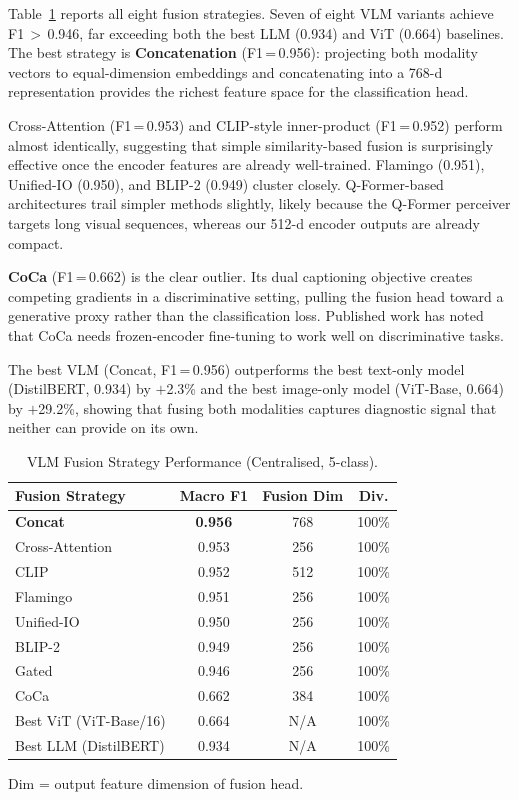 \documentclass[conference]{IEEEtran}
\begin{document}
Table~\ref{tab:vlmres} reports all eight fusion strategies.
Seven of eight VLM variants achieve F1\,$>$\,0.946, far exceeding
both the best LLM (0.934) and ViT (0.664) baselines. The best
strategy is \textbf{Concatenation} (F1\,=\,0.956): projecting both
modality vectors to equal-dimension embeddings and concatenating into a
768-d representation provides the richest feature space for the
classification head.

Cross-Attention (F1\,=\,0.953) and CLIP-style inner-product (F1\,=\,0.952)
perform almost identically, suggesting that simple similarity-based
fusion is surprisingly effective once the encoder features are already
well-trained. Flamingo (0.951), Unified-IO (0.950), and BLIP-2 (0.949)
cluster closely. Q-Former-based architectures trail simpler methods
slightly, likely because the Q-Former perceiver targets long visual
sequences, whereas our 512-d encoder outputs are already compact.

\textbf{CoCa} (F1\,=\,0.662) is the clear outlier. Its dual captioning
objective creates competing gradients in a discriminative setting,
pulling the fusion head toward a generative proxy rather than the
classification loss. Published work has noted that CoCa needs
frozen-encoder fine-tuning to work well on discriminative tasks.

The best VLM (Concat, F1\,=\,0.956) outperforms the best text-only
model (DistilBERT, 0.934) by $+$2.3\% and the best image-only model
(ViT-Base, 0.664) by $+$29.2\%, showing that fusing both modalities
captures diagnostic signal that neither can provide on its own.

\begin{table}[t]
\caption{VLM Fusion Strategy Performance (Centralised, 5-class).}
\label{tab:vlmres}
\centering\footnotesize
\setlength\tabcolsep{4pt}
\begin{tabular}{lccc}
\toprule
\textbf{Fusion Strategy} & \textbf{Macro F1} & \textbf{Fusion Dim} & \textbf{Div.}\\
\midrule
\rowcolor{vlmred!20}
\textbf{Concat}         & \textbf{0.956} & 768 & 100\% \\
Cross-Attention          & 0.953 & 256 & 100\% \\
CLIP                     & 0.952 & 512 & 100\% \\
Flamingo~\cite{Alayrac2022}  & 0.951 & 256 & 100\% \\
Unified-IO~\cite{Lu2022}     & 0.950 & 256 & 100\% \\
BLIP-2~\cite{Li2023blip}     & 0.949 & 256 & 100\% \\
Gated                    & 0.946 & 256 & 100\% \\
CoCa~\cite{Yu2022}           & 0.662 & 384 & 100\% \\
\midrule
Best ViT (ViT-Base/16)    & 0.664 & N/A & 100\% \\
Best LLM (DistilBERT)     & 0.934 & N/A & 100\% \\
\bottomrule
\end{tabular}
\vspace{1pt}
{\scriptsize Dim = output feature dimension of fusion head.}
\end{table}
\end{document}
